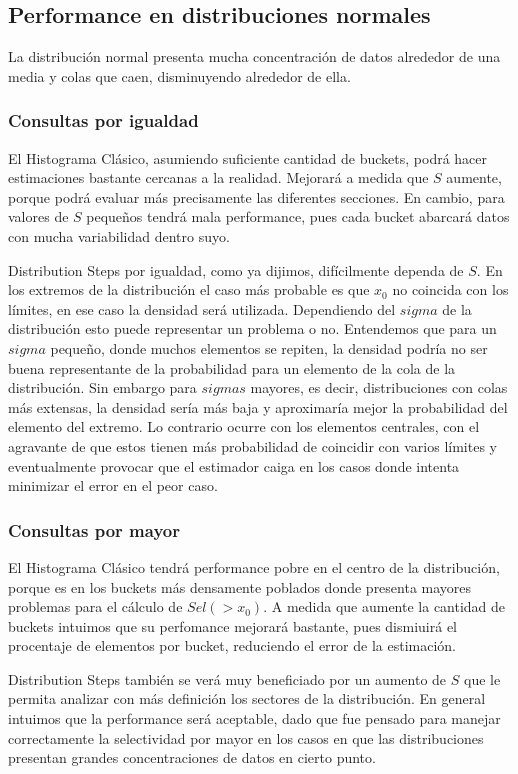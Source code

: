 \subsection{Performance en distribuciones normales}
La distribución normal presenta mucha concentración de datos alrededor de una media y colas que caen, disminuyendo alrededor de ella.

\subsubsection{Consultas por igualdad}
El Histograma Clásico, asumiendo suficiente cantidad de buckets, podrá hacer estimaciones bastante cercanas a la realidad. Mejorará a medida que $S$ aumente, porque podrá evaluar más precisamente las diferentes secciones. En cambio, para valores de $S$ pequeños tendrá mala performance, pues cada bucket abarcará datos con mucha variabilidad dentro suyo.

Distribution Steps por igualdad, como ya dijimos, difícilmente dependa de $S$. En los extremos de la distribución el caso más probable es que $x_0$ no coincida con los límites, en ese caso la densidad será utilizada. Dependiendo del $sigma$ de la distribución esto puede representar un problema o no. Entendemos que para un $sigma$ pequeño, donde muchos elementos se repiten, la densidad podría no ser buena representante de la probabilidad para un elemento de la cola de la distribución. Sin embargo para $sigmas$ mayores, es decir, distribuciones con colas más extensas, la densidad sería más baja y aproximaría mejor la probabilidad del elemento del extremo. Lo contrario ocurre con los elementos centrales, con el agravante de que estos tienen más probabilidad de coincidir con varios límites y eventualmente provocar que el estimador caiga en los casos donde intenta minimizar el error en el peor caso.


\subsubsection{Consultas por mayor}
El Histograma Clásico tendrá performance pobre en el centro de la distribución, porque es en los buckets más densamente poblados donde presenta mayores problemas para el cálculo de $Sel(>x_0)$. A medida que aumente la cantidad de buckets intuimos que su perfomance mejorará bastante, pues dismiuirá el procentaje de elementos por bucket, reduciendo el error de la estimación.

Distribution Steps también se verá muy beneficiado por un aumento de $S$ que le permita analizar con más definición los sectores de la distribución. En general intuimos que la performance será aceptable, dado que fue pensado para manejar correctamente la selectividad por mayor en los casos en que las distribuciones presentan grandes concentraciones de datos en cierto punto.

